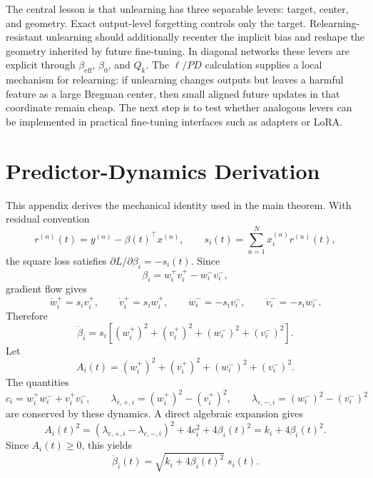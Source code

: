 \documentclass[11pt]{article}
\begin{document}
The central lesson is that unlearning has three separable levers: target, center, and geometry. Exact output-level forgetting controls only the target. Relearning-resistant unlearning should additionally recenter the implicit bias and reshape the geometry inherited by future fine-tuning. In diagonal networks these levers are explicit through \(\beta_{\mathrm{eff}}\), \(\beta_0\), and \(Q_k\). The \(\ell/PD\) calculation supplies a local mechanism for relearning: if unlearning changes outputs but leaves a harmful feature as a large Bregman center, then small aligned future updates in that coordinate remain cheap. The next step is to test whether analogous levers can be implemented in practical fine-tuning interfaces such as adapters or LoRA.

\appendix

\section{Predictor-Dynamics Derivation}
\label{app:predictor-dynamics}

This appendix derives the mechanical identity used in the main theorem. With residual convention
\begin{equation}
    r^{(n)}(t)=y^{(n)}-\beta(t)^\top x^{(n)},
    \qquad
    s_i(t)=\sum_{n=1}^N x_i^{(n)}r^{(n)}(t),
\end{equation}
the square loss satisfies \(\partial L/\partial \beta_i=-s_i(t)\). Since
\begin{equation}
    \beta_i=w_i^+v_i^+-w_i^-v_i^-,
\end{equation}
gradient flow gives
\begin{equation}
    \dot w_i^+=s_i v_i^+,
    \qquad
    \dot v_i^+=s_i w_i^+,
    \qquad
    \dot w_i^-=-s_i v_i^-,
    \qquad
    \dot v_i^-=-s_i w_i^-.
\end{equation}
Therefore
\begin{equation}
    \dot\beta_i
    =
    s_i\left[
        (w_i^+)^2+(v_i^+)^2+(w_i^-)^2+(v_i^-)^2
    \right].
\end{equation}
Let
\begin{equation}
    A_i(t)
    =
    (w_i^+)^2+(v_i^+)^2+(w_i^-)^2+(v_i^-)^2.
\end{equation}
The quantities
\begin{equation}
    c_i=w_i^+w_i^-+v_i^+v_i^-,
    \qquad
    \lambda_{e,+,i}=(w_i^+)^2-(v_i^+)^2,
    \qquad
    \lambda_{e,-,i}=(w_i^-)^2-(v_i^-)^2
\end{equation}
are conserved by these dynamics. A direct algebraic expansion gives
\begin{equation}
    A_i(t)^2
    =
    (\lambda_{e,+,i}-\lambda_{e,-,i})^2
    +4c_i^2
    +4\beta_i(t)^2
    =
    k_i+4\beta_i(t)^2.
\end{equation}
Since \(A_i(t)\ge0\), this yields
\begin{equation}
    \dot\beta_i(t)
    =
    \sqrt{k_i+4\beta_i(t)^2}\;s_i(t).
\end{equation}
\end{document}
